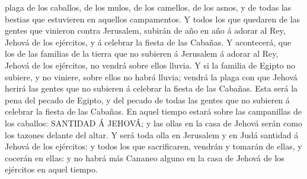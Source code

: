 plaga de los caballos, de los mulos, de los camellos, de los asnos, y de
todas las bestias que estuvieren en aquellos campamentos.
 Y todos los que quedaren de las gentes que vinieron
contra Jerusalem, subirán de año en año á adorar al Rey, Jehová de los
ejércitos, y á celebrar la fiesta de las Cabañas.  Y
acontecerá, que los de las familias de la tierra que no subieren á
Jerusalem á adorar al Rey, Jehová de los ejércitos, no vendrá sobre
ellos lluvia.  Y si la familia de Egipto no subiere, y no
viniere, sobre ellos no habrá lluvia; vendrá la plaga con que Jehová
herirá las gentes que no subieren á celebrar la fiesta de las Cabañas.
 Esta será la pena del pecado de Egipto, y del pecado de
todas las gentes que no subieren á celebrar la fiesta de las Cabañas.
 En aquel tiempo estará sobre las campanillas de los
caballos: SANTIDAD Á JEHOVÁ; y las ollas en la casa de Jehová serán como
los tazones delante del altar.  Y será toda olla en
Jerusalem y en Judá santidad á Jehová de los ejércitos: y todos los que
sacrificaren, vendrán y tomarán de ellas, y cocerán en ellas: y no habrá
más Cananeo alguno en la casa de Jehová de los ejércitos en aquel
tiempo.
